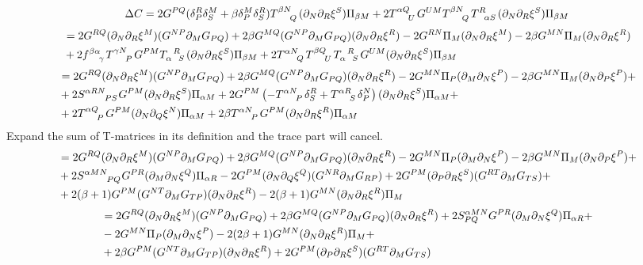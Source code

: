 \documentclass{article}
\begin{document}
\newpage 
\begin{align}
\Delta C = 2G^{PQ}(\delta^R_P\delta^M_S+\beta\delta^M_P\delta^R_S)\tensor{T}{^\beta^N_Q}(\pd_N\pd_R\xi^S)\Pi_{\beta M}+2\tensor{T}{^\alpha ^Q_U}G^{UM}\tensor{T}{^\beta ^N_Q}\tensor{T}{^R_\alpha _S}(\pd_N\pd_R\xi^S)\Pi_{\beta M}
\end{align}
\begin{align}
    &= 2G^{RQ}(\pd_N\pd_R\xi^M)(G^{NP}\pd_MG_{PQ})+2\beta G^{MQ}(G^{NP}\pd_M G_{PQ})(\pd_N\pd_R\xi^R)-2G^{RN}\Pi_M(\pd_N\pd_R\xi^M)-2\beta G^{MN}\Pi_M(\pd_N\pd_R\xi^R)\\
    &+2\tensor{f}{^{\beta\alpha}_\gamma}\tensor{T}{^{\gamma N}_P}G^{PM}\tensor{T}{_\alpha^R_S}(\pd_N\pd_R\xi^S)\Pi_{\beta M}+2\tensor{T}{^{\alpha N}_Q}\tensor{T}{^{\beta Q}_U}\tensor{T}{_\alpha^{R}_S}G^{UM}(\pd_N\pd_R\xi^S)\Pi_{\beta M}
\end{align}
\begin{align}
    &= 2G^{RQ}(\pd_N\pd_R\xi^M)(G^{NP}\pd_MG_{PQ})+2\beta G^{MQ}(G^{NP}\pd_M G_{PQ})(\pd_N\pd_R\xi^R)-2G^{MN}\Pi_P(\pd_M\pd_N\xi^P)-2\beta G^{MN}\Pi_M(\pd_N\pd_P\xi^P)+\\
    &+2\tensor{S}{^{\alpha RN}_P_S}G^{PM}(\pd_N\pd_R\xi^S)\Pi_{\alpha M}+2G^{PM}\left(-\tensor{T}{^\alpha ^N_P}\delta^R_S+\tensor{T}{^\alpha ^R_S}\delta^N_P\right)(\pd_N\pd_R\xi^S)\Pi_{\alpha M}+\\
    &+2\tensor{T}{^\alpha ^Q_P}G^{PM}(\pd_N\pd_Q\xi^N)\Pi_{\alpha M}+2\beta \tensor{T}{^\alpha ^N_P}G^{PM}(\pd_N\pd_R\xi^R)\Pi_{\alpha M}
\end{align}
Expand the sum of T-matrices in its definition and the trace part will cancel. 
\begin{align}
    &=2G^{RQ}(\pd_N\pd_R\xi^M)(G^{NP}\pd_MG_{PQ})+2\beta G^{MQ}(G^{NP}\pd_M G_{PQ})(\pd_N\pd_R\xi^R)-2G^{MN}\Pi_P(\pd_M\pd_N\xi^P)-2\beta G^{MN}\Pi_M(\pd_N\pd_P\xi^P)+\\
    &+2\tensor{S}{^{\alpha MN}_{PQ}}G^{PR}(\pd_M\pd_N\xi^Q)\Pi_{\alpha R}-2G^{PM}(\pd_N\pd_Q\xi^Q)(G^{NR}\pd_M G_{RP})+2G^{PM}(\pd_P\pd_R\xi^S)(G^{RT}\pd_M G_{TS})+\\
    &+2(\beta+1)G^{PM}(G^{NT}\pd_M G_{TP})(\pd_N\pd_R\xi^R)-2(\beta+1)G^{MN}(\pd_N\pd_R\xi^R)\Pi_M
\end{align}
\begin{align}
    &=2G^{RQ}(\partial_N\partial_R\xi^M)(G^{NP}\partial_MG_{PQ})+2\beta G^{MQ}(G^{NP}\partial_M G_{PQ})(\partial_N\partial_R\xi^R)+2S^{\alpha MN}_{PQ}G^{PR}(\partial_M\partial_N\xi^Q)\Pi_{\alpha R}+\\
    &-2G^{MN}\Pi_P(\partial_M\partial_N\xi^P)-2(2\beta+1)G^{MN}(\partial_N\partial_R\xi^R)\Pi_M+\\
    &+2\beta G^{PM}(G^{NT}\partial_M G_{TP})(\partial_N\partial_R\xi^R)+2G^{PM}(\partial_P\partial_R\xi^S)(G^{RT}\partial_M G_{TS})
\end{align}
\end{document}
